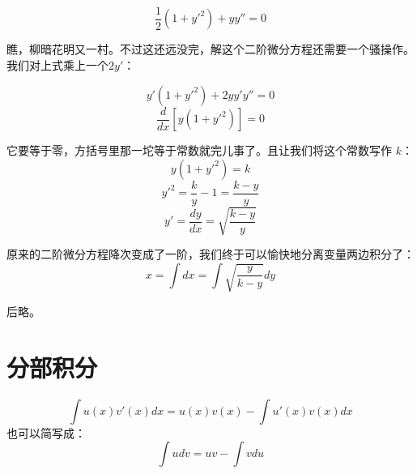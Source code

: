 \documentclass[12pt]{article}
\begin{document}
\begin{equation}
   \frac{1}{2}(1+y'^2) + yy'' = 0
\end{equation}

瞧，柳暗花明又一村。不过这还远没完，解这个二阶微分方程还需要一个骚操作。我们对上式乘上一个$2y'$：

\begin{equation}
   y'(1+y'^2) + 2yy'y'' = 0
\end{equation}
\begin{equation}
   \frac{d}{dx}[y(1+y'^2)] = 0
\end{equation}

它要等于零，方括号里那一坨等于常数就完儿事了。且让我们将这个常数写作 $k$：
$$
y(1+y'^2) = k
$$
$$
y'^2 = \frac{k}{y} - 1 = \frac{k-y}{y}
$$
$$
y' = \frac{dy}{dx} = \sqrt{\frac{k-y}{y}}
$$

原来的二阶微分方程降次变成了一阶，我们终于可以愉快地分离变量两边积分了：
$$
x = \int{dx} = \int{\sqrt{\frac{y}{k-y}}dy}
$$

后略。

\section{分部积分}
$$
\int{u(x)v'(x)}dx = u(x)v(x) - \int{u'(x)v(x)}dx
$$
也可以简写成：
$$
\int{udv} = uv - \int{vdu}
$$



\end{document}
